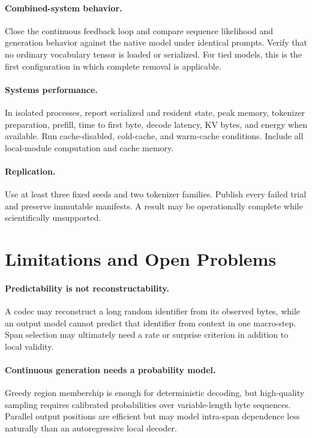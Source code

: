 \documentclass[10pt,twocolumn]{article}
\begin{document}
\paragraph{Combined-system behavior.}
Close the continuous feedback loop and compare sequence likelihood and generation behavior against
the native model under identical prompts. Verify that no ordinary vocabulary tensor is loaded or
serialized. For tied models, this is the first configuration in which complete removal is
applicable.

\paragraph{Systems performance.}
In isolated processes, report serialized and resident state, peak memory, tokenizer preparation,
prefill, time to first byte, decode latency, KV bytes, and energy when available. Run
cache-disabled, cold-cache, and warm-cache conditions. Include all local-module computation and
cache memory.

\paragraph{Replication.}
Use at least three fixed seeds and two tokenizer families. Publish every failed trial and preserve
immutable manifests. A result may be operationally complete while scientifically unsupported.

\section{Limitations and Open Problems}

\paragraph{Predictability is not reconstructability.}
A codec may reconstruct a long random identifier from its observed bytes, while an output model
cannot predict that identifier from context in one macro-step. Span selection may ultimately need
a rate or surprise criterion in addition to local validity.

\paragraph{Continuous generation needs a probability model.}
Greedy region membership is enough for deterministic decoding, but high-quality sampling requires
calibrated probabilities over variable-length byte sequences. Parallel output positions are
efficient but may model intra-span dependence less naturally than an autoregressive local decoder.
\end{document}

